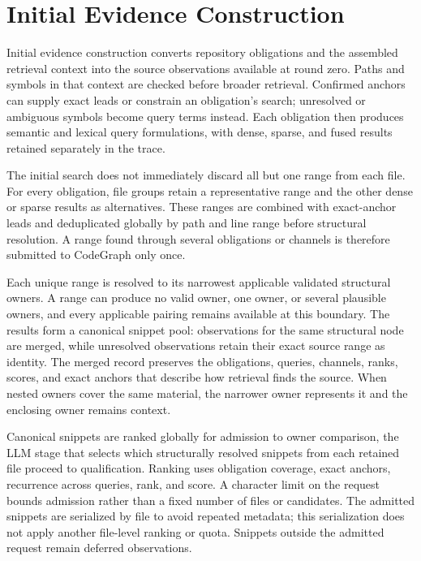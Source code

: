 \section{Initial Evidence Construction}\label{sec:initial-evidence-construction}

Initial evidence construction converts repository obligations and the assembled retrieval context into the source observations available at round zero. Paths and symbols in that context are checked before broader retrieval. Confirmed anchors can supply exact leads or constrain an obligation's search; unresolved or ambiguous symbols become query terms instead. Each obligation then produces semantic and lexical query formulations, with dense, sparse, and fused results retained separately in the trace.

The initial search does not immediately discard all but one range from each file. For every obligation, file groups retain a representative range and the other dense or sparse results as alternatives. These ranges are combined with exact-anchor leads and deduplicated globally by path and line range before structural resolution. A range found through several obligations or channels is therefore submitted to CodeGraph only once.

Each unique range is resolved to its narrowest applicable validated structural owners. A range can produce no valid owner, one owner, or several plausible owners, and every applicable pairing remains available at this boundary. The results form a canonical snippet pool: observations for the same structural node are merged, while unresolved observations retain their exact source range as identity. The merged record preserves the obligations, queries, channels, ranks, scores, and exact anchors that describe how retrieval finds the source. When nested owners cover the same material, the narrower owner represents it and the enclosing owner remains context.

Canonical snippets are ranked globally for admission to owner comparison, the LLM stage that selects which structurally resolved snippets from each retained file proceed to qualification. Ranking uses obligation coverage, exact anchors, recurrence across queries, rank, and score. A character limit on the request bounds admission rather than a fixed number of files or candidates. The admitted snippets are serialized by file to avoid repeated metadata; this serialization does not apply another file-level ranking or quota. Snippets outside the admitted request remain deferred observations.

